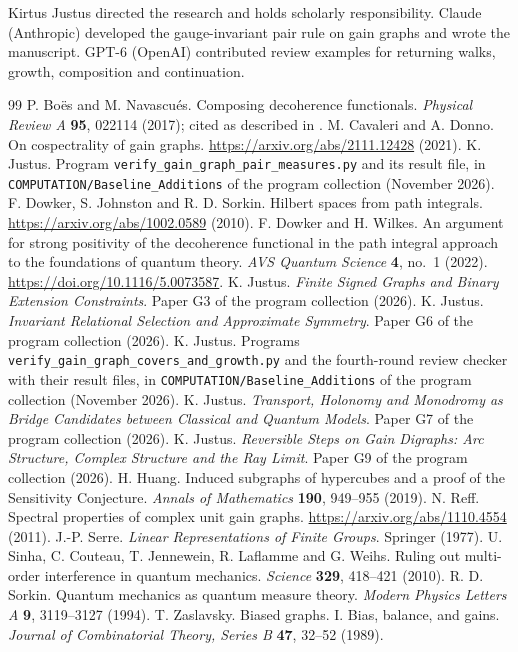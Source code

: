 \documentclass[11pt,a4paper]{article}
\begin{document}
\begin{titlepage}
\vfill
{\small Kirtus Justus directed the research and holds scholarly responsibility. Claude (Anthropic) developed the gauge-invariant pair rule on gain graphs and wrote the manuscript. GPT-6 (OpenAI) contributed review examples for returning walks, growth, composition and continuation.\par}
\end{titlepage}
\setcounter{page}{2}

\clearpage
\begin{thebibliography}{99}
 P. Bo\"es and M. Navascu\'es. Composing decoherence functionals. \emph{Physical Review A} \textbf{95}, 022114 (2017); cited as described in \cite{dw}.
 M. Cavaleri and A. Donno. On cospectrality of gain graphs. \url{https://arxiv.org/abs/2111.12428} (2021).
 K. Justus. Program \texttt{verify\_gain\_graph\_pair\_measures.py} and its result file, in \texttt{COMPUTATION/Baseline\_Additions} of the program collection (November 2026).
 F. Dowker, S. Johnston and R. D. Sorkin. Hilbert spaces from path integrals. \url{https://arxiv.org/abs/1002.0589} (2010).
 F. Dowker and H. Wilkes. An argument for strong positivity of the decoherence functional in the path integral approach to the foundations of quantum theory. \emph{AVS Quantum Science} \textbf{4}, no.~1 (2022). \url{https://doi.org/10.1116/5.0073587}.
 K. Justus. \emph{Finite Signed Graphs and Binary Extension Constraints}. Paper G3 of the program collection (2026).
 K. Justus. \emph{Invariant Relational Selection and Approximate Symmetry}. Paper G6 of the program collection (2026).
 K. Justus. Programs \texttt{verify\_gain\_graph\_covers\_and\_growth.py} and the fourth-round review checker with their result files, in \texttt{COMPUTATION/Baseline\_Additions} of the program collection (November 2026).
 K. Justus. \emph{Transport, Holonomy and Monodromy as Bridge Candidates between Classical and Quantum Models}. Paper G7 of the program collection (2026).
 K. Justus. \emph{Reversible Steps on Gain Digraphs: Arc Structure, Complex Structure and the Ray Limit}. Paper G9 of the program collection (2026).
 H. Huang. Induced subgraphs of hypercubes and a proof of the Sensitivity Conjecture. \emph{Annals of Mathematics} \textbf{190}, 949--955 (2019).
 N. Reff. Spectral properties of complex unit gain graphs. \url{https://arxiv.org/abs/1110.4554} (2011).
 J.-P. Serre. \emph{Linear Representations of Finite Groups}. Springer (1977).
 U. Sinha, C. Couteau, T. Jennewein, R. Laflamme and G. Weihs. Ruling out multi-order interference in quantum mechanics. \emph{Science} \textbf{329}, 418--421 (2010).
 R. D. Sorkin. Quantum mechanics as quantum measure theory. \emph{Modern Physics Letters A} \textbf{9}, 3119--3127 (1994).
 T. Zaslavsky. Biased graphs. I. Bias, balance, and gains. \emph{Journal of Combinatorial Theory, Series B} \textbf{47}, 32--52 (1989).
\end{thebibliography}
\end{document}
